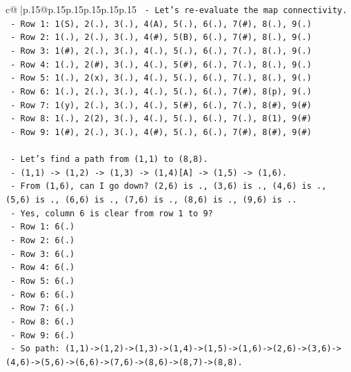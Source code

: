 \documentclass{article}
\begin{document}
{\begin{supertabular}{c@{$\;$}|p{.15\linewidth}@{}p{.15\linewidth}p{.15\linewidth}p{.15\linewidth}p{.15\linewidth}p{.15\linewidth}}
{{{\texttt{          {-} Let's re{-}evaluate the map connectivity.} \\
\texttt{          {-} Row 1: 1(S), 2(.), 3(.), 4(A), 5(.), 6(.), 7(\#), 8(.), 9(.)} \\
\texttt{          {-} Row 2: 1(.), 2(.), 3(.), 4(\#), 5(B), 6(.), 7(\#), 8(.), 9(.)} \\
\texttt{          {-} Row 3: 1(\#), 2(.), 3(.), 4(.), 5(.), 6(.), 7(.), 8(.), 9(.)} \\
\texttt{          {-} Row 4: 1(.), 2(\#), 3(.), 4(.), 5(\#), 6(.), 7(.), 8(.), 9(.)} \\
\texttt{          {-} Row 5: 1(.), 2(x), 3(.), 4(.), 5(.), 6(.), 7(.), 8(.), 9(.)} \\
\texttt{          {-} Row 6: 1(.), 2(.), 3(.), 4(.), 5(.), 6(.), 7(\#), 8(p), 9(.)} \\
\texttt{          {-} Row 7: 1(y), 2(.), 3(.), 4(.), 5(\#), 6(.), 7(.), 8(\#), 9(\#)} \\
\texttt{          {-} Row 8: 1(.), 2(2), 3(.), 4(.), 5(.), 6(.), 7(.), 8(1), 9(\#)} \\
\texttt{          {-} Row 9: 1(\#), 2(.), 3(.), 4(\#), 5(.), 6(.), 7(\#), 8(\#), 9(\#)} \\
\\ 
\texttt{  {-} Let's find a path from (1,1) to (8,8).} \\
\texttt{    {-} (1,1) {-}> (1,2) {-}> (1,3) {-}> (1,4){[}A{]} {-}> (1,5) {-}> (1,6).} \\
\texttt{    {-} From (1,6), can I go down? (2,6) is ., (3,6) is ., (4,6) is ., (5,6) is ., (6,6) is ., (7,6) is ., (8,6) is ., (9,6) is ..} \\
\texttt{    {-} Yes, column 6 is clear from row 1 to 9?} \\
\texttt{      {-} Row 1: 6(.)} \\
\texttt{      {-} Row 2: 6(.)} \\
\texttt{      {-} Row 3: 6(.)} \\
\texttt{      {-} Row 4: 6(.)} \\
\texttt{      {-} Row 5: 6(.)} \\
\texttt{      {-} Row 6: 6(.)} \\
\texttt{      {-} Row 7: 6(.)} \\
\texttt{      {-} Row 8: 6(.)} \\
\texttt{      {-} Row 9: 6(.)} \\
\texttt{    {-} So path: (1,1){-}>(1,2){-}>(1,3){-}>(1,4){-}>(1,5){-}>(1,6){-}>(2,6){-}>(3,6){-}>(4,6){-}>(5,6){-}>(6,6){-}>(7,6){-}>(8,6){-}>(8,7){-}>(8,8).} \\
}}}
\end{supertabular}}
\end{document}
